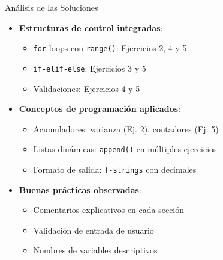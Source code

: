 \documentclass[10pt]{beamer}
\begin{document}
\begin{frame}{Análisis de las Soluciones}
  \begin{itemize}
    \item \textbf{Estructuras de control integradas}:
      \begin{itemize}
        \item \texttt{for} loops con \texttt{range()}: Ejercicios 2, 4 y 5
        \item \texttt{if-elif-else}: Ejercicios 3 y 5
        \item Validaciones: Ejercicios 4 y 5
      \end{itemize}
    \item \textbf{Conceptos de programación aplicados}:
      \begin{itemize}
        \item Acumuladores: varianza (Ej. 2), contadores (Ej. 5)
        \item Listas dinámicas: \texttt{append()} en múltiples ejercicios
        \item Formato de salida: \texttt{f-strings} con decimales
      \end{itemize}
    \item \textbf{Buenas prácticas observadas}:
      \begin{itemize}
        \item Comentarios explicativos en cada sección
        \item Validación de entrada de usuario
        \item Nombres de variables descriptivos
      \end{itemize}
  \end{itemize}
\end{frame}
\end{document}
